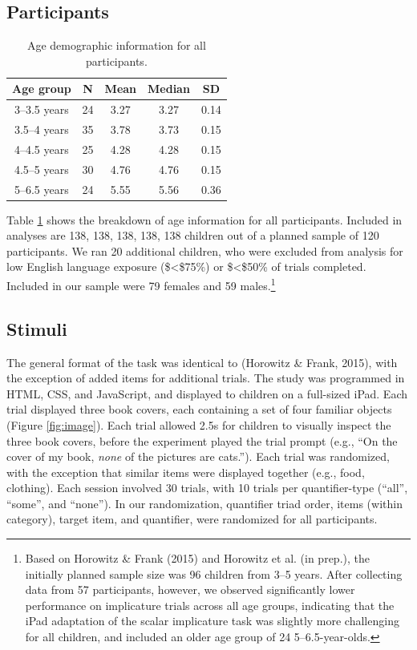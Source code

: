 \documentclass[10pt, letterpaper]{article}
\begin{document}
\subsection{Participants}\label{participants}

\begin{table}[ht]
\centering
\begin{tabular}{c c c c c } 
 \hline
 Age group & N & Mean & Median & SD \\
 \hline
 3--3.5 years & 24 & 3.27 & 3.27 & 0.14\\
 \hline
 3.5--4 years & 35 & 3.78 & 3.73 & 0.15 \\ 
 \hline
 4--4.5 years & 25 & 4.28 & 4.28 & 0.15\\
 \hline
 4.5--5 years & 30 & 4.76 & 4.76 & 0.15 \\
 \hline
 5--6.5 years & 24 & 5.55 & 5.56 & 0.36 \\
 \hline
\end{tabular}
\caption{Age demographic information for all participants.}
\label{tab:age}
\end{table}

Table \ref{tab:age} shows the breakdown of age information for all
participants. Included in analyses are 138, 138, 138, 138, 138 children
out of a planned sample of 120 participants. We ran 20 additional
children, who were excluded from analysis for low English language
exposure (\$\textless{}\$75\%) or \$\textless{}\$50\% of trials
completed. Included in our sample were 79 females and 59
males.\footnote{Based on Horowitz \& Frank (2015) and Horowitz et al.
  (in prep.), the initially planned sample size was 96 children from
  3--5 years. After collecting data from 57 participants, however, we
  observed significantly lower performance on implicature trials across
  all age groups, indicating that the iPad adaptation of the scalar
  implicature task was slightly more challenging for all children, and
  included an older age group of 24 5--6.5-year-olds.}

\subsection{Stimuli}\label{stimuli}

The general format of the task was identical to (Horowitz \& Frank,
2015), with the exception of added items for additional trials. The
study was programmed in HTML, CSS, and JavaScript, and displayed to
children on a full-sized iPad. Each trial displayed three book covers,
each containing a set of four familiar objects (Figure \ref{fig:image}).
Each trial allowed 2.5s for children to visually inspect the three book
covers, before the experiment played the trial prompt (e.g., ``On the
cover of my book, \emph{none} of the pictures are cats.''). Each trial
was randomized, with the exception that similar items were displayed
together (e.g., food, clothing). Each session involved 30 trials, with
10 trials per quantifier-type (``all'', ``some'', and ``none''). In our
randomization, quantifier triad order, items (within category), target
item, and quantifier, were randomized for all participants.
\end{document}

